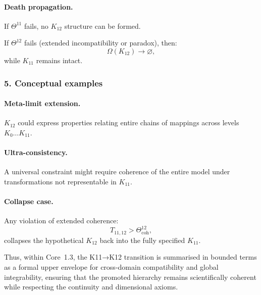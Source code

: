 \paragraph{Death propagation.}
If $\Theta^{11}$ fails, no $K_{12}$ structure can be formed.

If $\Theta^{12}$ fails (extended incompatibility or paradox), then:
\[
\Omega(K_{12}) \rightarrow \varnothing,
\]
while $K_{11}$ remains intact.

\subsubsection{5. Conceptual examples}

\paragraph{Meta-limit extension.}
$K_{12}$ could express properties relating entire chains of mappings across
levels $K_0\dots K_{11}$.

\paragraph{Ultra-consistency.}
A universal constraint might require coherence of the entire model under
transformations not representable in $K_{11}$.

\paragraph{Collapse case.}
Any violation of extended coherence:
\[
T_{11,12} > \Theta^{12}_{\mathrm{coh}},
\]
collapses the hypothetical $K_{12}$ back into the fully specified $K_{11}$.

Thus, within Core~1.3, the K11→K12 transition is summarised in bounded
terms as a formal upper envelope for cross-domain compatibility and global
integrability, ensuring that the promoted hierarchy remains scientifically
coherent while respecting the continuity and dimensional axioms.

